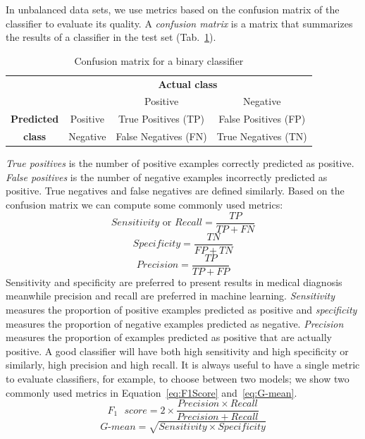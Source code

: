 In unbalanced data sets, we use metrics based on the confusion matrix of the classifier to evaluate its quality. A \emph{confusion matrix} is a matrix that summarizes the results of a classifier in the test set (Tab.~\ref{tab:ConfusionMatrix}).
\begin{table}[h]
	\centering
	\begin{tabular}{cc|c|c|}
		&\multicolumn{3}{c}{\textbf{Actual class}}\\
		&&Positive & Negative \\
		\cline{2-4}
		\textbf{Predicted}&Positive&True Positives (TP)& False Positives (FP)\\
		\cline{2-4}
		\textbf{class}&Negative&False Negatives (FN) & True Negatives (TN)\\
		\cline{2-4}
	\end{tabular}
	\caption{Confusion matrix for a binary classifier}
	\label{tab:ConfusionMatrix}
\end{table}
\emph{True positives} is the number of positive examples correctly predicted as positive. \emph{False positives} is the number of negative examples incorrectly predicted as positive. True negatives and false negatives are defined similarly. Based on the confusion matrix we can compute some commonly used metrics:
\begin{equation}
	Sensitivity \text{ or } Recall = \frac{TP}{TP+FN}
\end{equation}
\begin{equation}
	Specificity = \frac{TN}{FP+TN}
\end{equation}
\begin{equation}
	Precision = \frac{TP}{TP+FP}
\end{equation}
Sensitivity and specificity are preferred to present results in medical diagnosis meanwhile precision and recall are preferred in machine learning. \emph{Sensitivity} measures the proportion of positive examples predicted as positive and \emph{specificity} measures the proportion of negative examples predicted as negative. \emph{Precision} measures the proportion of examples predicted as positive that are actually positive. A good classifier will have both high sensitivity and high specificity or similarly, high precision and high recall. It is always useful to have a single metric to evaluate classifiers, for example, to choose between two models; we show two commonly used metrics in Equation~\ref{eq:F1Score} and~\ref{eq:G-mean}.
\begin{equation}
	F_1\text{ }score = 2\times\frac{Precision \times Recall}{Precision + Recall}
	\label{eq:F1Score}
\end{equation}
\begin{equation}
	G\text{-}mean = \sqrt{Sensitivity \times Specificity}
	\label{eq:G-mean}
\end{equation}


